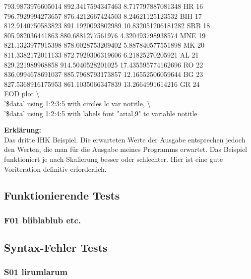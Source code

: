 \documentclass[a4paper,11pt]{article}
\begin{document}
{\begin{mdframed}[linewidth=0pt, backgroundcolor=background, innertopmargin=10pt, innerbottommargin=10pt]
		793.9873976605014 892.3417594347463 8.717797887081348 HR 16\\
		796.7929994273657 876.4212667424503 8.24621125123532 BIH 17\\
		812.9140750583823 891.1920093802989 10.832051206181282 SRB 18\\
		805.982036441863 880.6881277561976 4.320493798938574 MNE 19\\
		821.1323977915398 878.0028753209402 5.887840577551898 MK 20\\
		811.3382172011133 872.7929306319606 6.21825270205921 AL 21\\
		829.221989968858 914.5040528201025 17.435595774162696 RO 22\\
		836.0994678691037 885.7968793173857 12.16552506059644 BG 23\\
		827.5368916175953 861.1035066347839 13.2664991614216 GR 24\\
		EOD
		plot \textbackslash \\
		'\$data' using 1:2:3:5 with circles lc var notitle, \textbackslash \\
		'\$data' using 1:2:4:5 with labels font "arial,9" tc variable notitle
\end{mdframed}

\vspace{5mm}
\textbf{Erkl\"arung:}\\
Das dritte IHK Beispiel. Die erwarteten Werte der Ausgabe entsprechen jedoch den Werten, die man f\"ur die Ausgabe meines Programms erwartet.
Das Beispiel funktioniert je nach Skalierung besser oder schlechter. Hier ist eine gute Voriteration definitiv erforderlich.\\

\subsection{Funktionierende Tests}

\subsubsection{F01 bliblablub etc.}

\subsection{Syntax-Fehler Tests}

\subsubsection{S01 lirumlarum}

}
\end{document}
